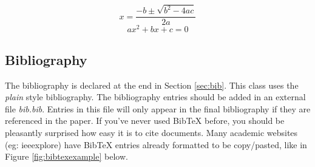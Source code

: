 \documentclass[../main.tex]{subfiles}
\begin{document}
	\begin{equation}\label{eq:quad0}
		x=\frac{-b\pm\sqrt{b^2-4ac}}{2a}
	\end{equation}
	\begin{equation}\label{eq:quad1}
		ax^2+bx+c=0
	\end{equation}

	
	\subsection{Bibliography}
	
	The bibliography is declared at the end in Section \ref{sec:bib}.  This class uses the \textit{plain} style bibliography.  The bibliography entries should be added in an external file \textit{bib.bib}.  Entries in this file will only appear in the final bibliography if they are referenced in the paper\cite{Overleaf}.  If you've never used BibTeX before, you should be pleasantly surprised how easy it is to cite documents.  Many academic websites (eg: ieeexplore) have BibTeX entries already formatted to be copy/pasted, like in Figure \ref{fig:bibtexexample} below\cite{9087123}.
	
\end{document}
